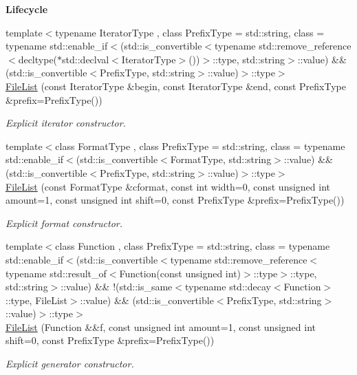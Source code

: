 \begin{Indent}{\bf Lifecycle}
\begin{DoxyCompactItemize}
{\footnotesize template$<$typename Iterator\-Type , class Prefix\-Type  = std\-::string, class  = typename std\-::enable\-\_\-if$<$(std\-::is\-\_\-convertible$<$typename std\-::remove\-\_\-reference$<$decltype($\ast$std\-::declval$<$\-Iterator\-Type$>$())$>$\-::type, std\-::string$>$\-::value) \&\& (std\-::is\-\_\-convertible$<$\-Prefix\-Type, std\-::string$>$\-::value)$>$\-::type$>$ }\\\hyperlink{exceptionmagrathea_1_1FileList_aed2961e12314fb53bd8350d87921d9e7}{File\-List} (const Iterator\-Type \&begin, const Iterator\-Type \&end, const Prefix\-Type \&prefix=Prefix\-Type())
\begin{DoxyCompactList}\small\item\em Explicit iterator constructor. \end{DoxyCompactList}\item 
{\footnotesize template$<$class Format\-Type , class Prefix\-Type  = std\-::string, class  = typename std\-::enable\-\_\-if$<$(std\-::is\-\_\-convertible$<$\-Format\-Type, std\-::string$>$\-::value) \&\& (std\-::is\-\_\-convertible$<$\-Prefix\-Type, std\-::string$>$\-::value)$>$\-::type$>$ }\\\hyperlink{exceptionmagrathea_1_1FileList_ab615c7d5cd3b7969715ad8b97dfe21b6}{File\-List} (const Format\-Type \&cformat, const int width=0, const unsigned int amount=1, const unsigned int shift=0, const Prefix\-Type \&prefix=Prefix\-Type())
\begin{DoxyCompactList}\small\item\em Explicit format constructor. \end{DoxyCompactList}\item 
{\footnotesize template$<$class Function , class Prefix\-Type  = std\-::string, class  = typename std\-::enable\-\_\-if$<$(std\-::is\-\_\-convertible$<$typename std\-::remove\-\_\-reference$<$typename std\-::result\-\_\-of$<$\-Function(const unsigned int)$>$\-::type$>$\-::type, std\-::string$>$\-::value) \&\& !(std\-::is\-\_\-same$<$typename std\-::decay$<$\-Function$>$\-::type, File\-List$>$\-::value) \&\& (std\-::is\-\_\-convertible$<$\-Prefix\-Type, std\-::string$>$\-::value)$>$\-::type$>$ }\\\hyperlink{exceptionmagrathea_1_1FileList_ad78496380a867bd6b712b0ad3385eb25}{File\-List} (Function \&\&f, const unsigned int amount=1, const unsigned int shift=0, const Prefix\-Type \&prefix=Prefix\-Type())
\begin{DoxyCompactList}\small\item\em Explicit generator constructor. \end{DoxyCompactList}\end{DoxyCompactItemize}
\end{Indent}
